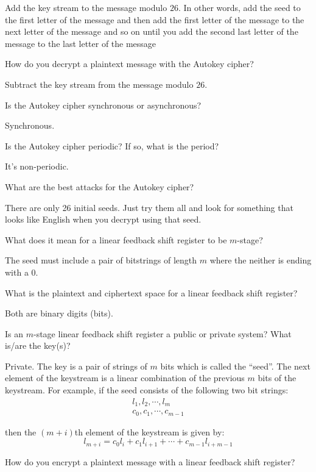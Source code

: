 \documentclass{article}
\newcounter{qcounter}
\newcommand{\showqcounter}{\theqcounter}
\newcommand{\question}{\vspace{5mm}\addtocounter{qcounter}{1}\vspace{5mm}{\bf Q\showqcounter: }}
\newcommand{\answer}{\vspace{5mm}{\bf A\showqcounter: }}
\begin{document}
\answer Add the key stream to the message modulo $26$. In other words, add the seed to the first letter of the message and then 
  add the first letter of the message to the next letter of the message and so on until you add the second last letter of the message 
  to the last letter of the message


\question How do you decrypt a plaintext message with the Autokey cipher?

\answer Subtract the key stream from the message modulo $26$.


\question Is the Autokey cipher synchronous or asynchronous?

\answer Synchronous.


\question Is the Autokey cipher periodic? If so, what is the period?

\answer It's non-periodic.


\question What are the best attacks for the Autokey cipher?

\answer There are only 26 initial seeds. Just try them all and look for something that looks like English when you decrypt using that seed.


\question What does it mean for a linear feedback shift register to be $m$-stage?

\answer The seed must include a pair of bitstrings of length $m$ where the neither is ending with a $0$.


\question What is the plaintext and ciphertext space for a linear feedback shift register?

\answer Both are binary digits (bits).


\question Is an $m$-stage linear feedback shift register a public or private system? What is/are the key(s)?

\answer Private. The key is a pair of strings of $m$ bits which is called the ``seed''. The next element of the keystream is a linear 
  combination of the previous $m$ bits of the keystream. For example, if the seed consists of the following two bit strings:
  \begin{align*}
    l_1, l_2, \cdots, l_m \\
    c_0, c_1, \cdots, c_{m-1}
  \end{align*}

  then the $(m + i)$th element of the keystream is given by:
  $$
    l_{m + i} = c_0 l_{i} + c_1 l_{i + 1} + \cdots + c_{m - 1} l_{i + m - 1}
  $$


\question How do you encrypt a plaintext message with a linear feedback shift register?
\end{document}
